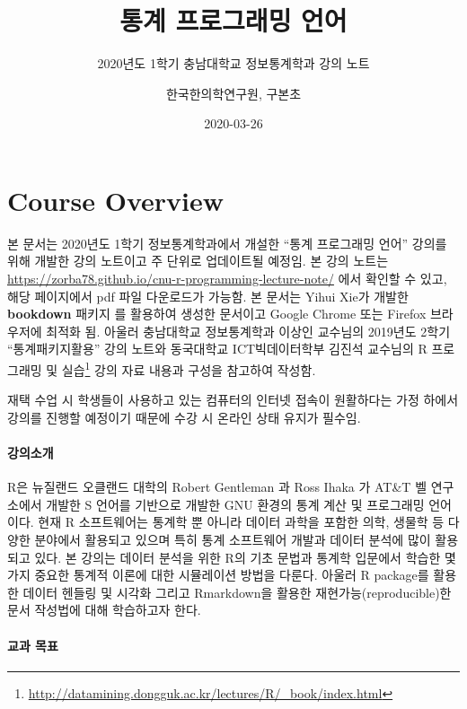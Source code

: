 \documentclass[
  11pt,
]{krantz}
\title{통계 프로그래밍 언어}
\subtitle{2020년도 1학기 충남대학교 정보통계학과 강의 노트}
\author{한국한의학연구원, 구본초}
\date{2020-03-26}
\renewcommand{\href}[2]{#2\footnote{\url{#1}}}
\let\BeginKnitrBlock\begin \let\EndKnitrBlock\end
\begin{document}
\maketitle

{
\hypersetup{linkcolor=}
\setcounter{tocdepth}{2}
\tableofcontents
}
\listoftables
\listoffigures
\hypertarget{overview}{%
\chapter*{Course Overview}\label{overview}}


\BeginKnitrBlock{rmdnote}
본 문서는 2020년도 1학기 정보통계학과에서 개설한 ``통계 프로그래밍 언어'' 강의를 위해 개발한 강의 노트이고 주 단위로 업데이트될 예정임. 본 강의 노트는 \url{https://zorba78.github.io/cnu-r-programming-lecture-note/} 에서 확인할 수 있고, 해당 페이지에서 pdf 파일 다운로드가 가능함. 본 문서는 Yihui Xie가 개발한 \textbf{bookdown} 패키지 \citep{xie-2016}를 활용하여 생성한 문서이고 Google Chrome 또는 Firefox 브라우저에 최적화 됨. 아울러 충남대학교 정보통계학과 이상인 교수님의 2019년도 2학기 ``통계패키지활용'' 강의 노트와 동국대학교 ICT빅데이터학부 김진석 교수님의 \href{http://datamining.dongguk.ac.kr/lectures/R/_book/index.html}{R 프로그래밍 및 실습} 강의 자료 내용과 구성을 참고하여 작성함.

재택 수업 시 학생들이 사용하고 있는 컴퓨터의 인터넷 접속이 원활하다는 가정 하에서 강의를 진행할 예정이기 때문에 수강 시 온라인 상태 유지가 필수임.
\EndKnitrBlock{rmdnote}

\hypertarget{intro-lec}{%
\subsubsection*{강의소개}\label{intro-lec}}


R은 뉴질랜드 오클랜드 대학의 Robert Gentleman 과 Ross Ihaka 가 AT\&T 벨 연구소에서 개발한 S 언어를 기반으로 개발한 GNU 환경의 통계 계산 및 프로그래밍 언어이다. 현재 R 소프트웨어는 통계학 뿐 아니라 데이터 과학을 포함한 의학, 생물학 등 다양한 분야에서 활용되고 있으며 특히 통계 소프트웨어 개발과 데이터 분석에 많이 활용되고 있다. 본 강의는 데이터 분석을 위한 R의 기초 문법과 통계학 입문에서 학습한 몇 가지 중요한 통계적 이론에 대한 시뮬레이션 방법을 다룬다. 아울러 R package를 활용한 데이터 헨들링 및 시각화 그리고 Rmarkdown을 활용한 재현가능(reproducible)한 문서 작성법에 대해 학습하고자 한다.

\hypertarget{purpose-course}{%
\subsubsection*{교과 목표}\label{purpose-course}}
\end{document}
